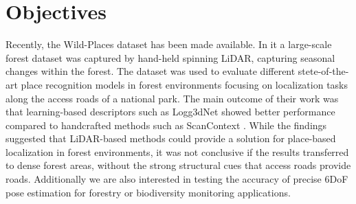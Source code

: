 \section{Objectives}
Recently, the Wild-Places dataset \cite{knights2023icra} has been made available. In it a large-scale forest dataset was captured by hand-held spinning LiDAR, capturing seasonal changes within the forest. The dataset was used to evaluate different stete-of-the-art place recognition models in forest environments focusing on localization tasks along the access roads of a national park. The main outcome of their work was that learning-based descriptors such as Logg3dNet \cite{vidanapathirana2022icra} showed better performance compared to handcrafted methods such as ScanContext \cite{kim2018iros}. While the findings suggested that LiDAR-based methods could provide a solution for place-based localization in forest environments, it was not conclusive if the results transferred to dense forest areas, without the strong structural cues that access roads provide roads. Additionally we are also interested in testing the accuracy of precise 6DoF pose estimation for forestry or biodiversity monitoring applications.




